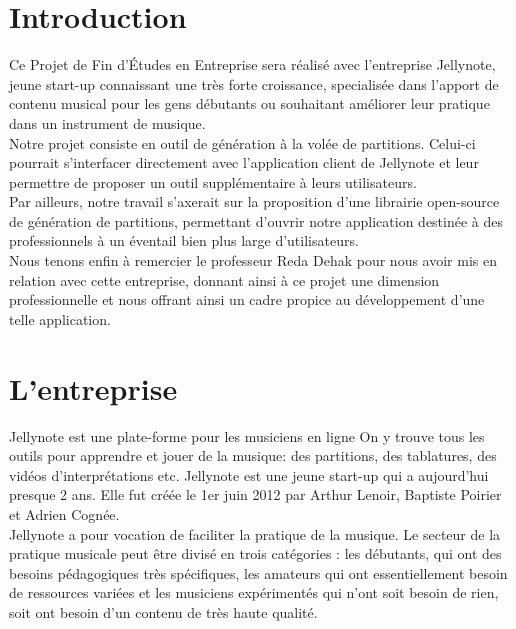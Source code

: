 \documentclass[12pt]{article}
\begin{document}


\newpage
\tableofcontents

\newpage
\clearpage
{}

\section{Introduction}

Ce Projet de Fin d'Études en Entreprise sera réalisé avec l'entreprise Jellynote, jeune start-up connaissant une très forte croissance, specialisée dans l'apport de contenu musical pour les gens débutants ou souhaitant améliorer leur pratique dans un instrument de musique.\\

Notre projet consiste en outil de génération à la volée de partitions. Celui-ci pourrait s'interfacer directement avec l'application client de Jellynote et leur permettre de proposer un outil supplémentaire à leurs utilisateurs.\\

Par ailleurs, notre travail s'axerait sur la proposition d'une librairie open-source de génération de partitions, permettant d'ouvrir notre application destinée à des professionnels à un éventail bien plus large d'utilisateurs.\\

Nous tenons enfin à remercier le professeur Reda Dehak pour nous avoir mis en relation avec cette entreprise, donnant ainsi à ce projet une dimension professionnelle et nous offrant ainsi un cadre propice au développement d'une telle application.


\newpage
\section{L'entreprise}
Jellynote est une plate-forme pour les musiciens en ligne On y trouve tous les outils pour apprendre et jouer de la musique: des partitions, des tablatures, des vidéos d’interprétations etc. Jellynote est une jeune start-up qui a aujourd’hui presque 2 ans. Elle fut créée le 1er juin 2012 par Arthur Lenoir, Baptiste Poirier et Adrien Cognée.\\

Jellynote a pour vocation de faciliter la pratique de la musique. Le secteur de la pratique musicale peut être divisé en trois catégories : les débutants, qui ont des besoins pédagogiques très spécifiques, les amateurs qui ont essentiellement besoin de ressources variées et les musiciens expérimentés qui n’ont soit besoin de rien, soit ont besoin d’un contenu de très haute qualité.\\
\end{document}
